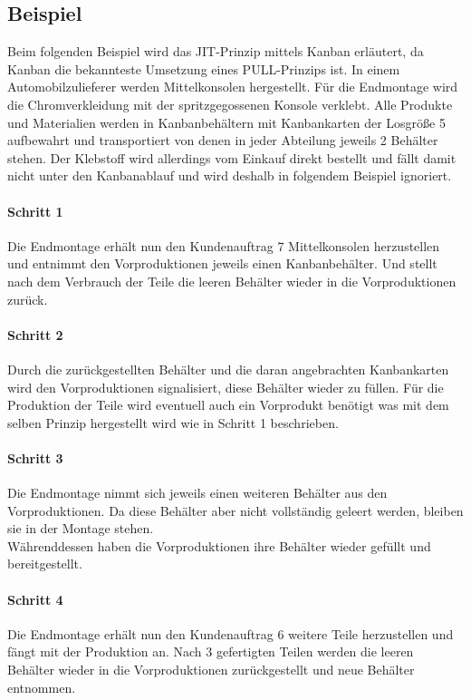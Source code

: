 \documentclass[00_ToyotaProduktionssystem.tex]{subfiles}
\begin{document}
\subsection{Beispiel}
Beim folgenden Beispiel wird das JIT-Prinzip mittels Kanban erläutert, da Kanban die bekannteste Umsetzung eines PULL-Prinzips ist.
In einem Automobilzulieferer werden Mittelkonsolen hergestellt. Für die Endmontage wird die Chromverkleidung mit der spritzgegossenen Konsole verklebt. Alle Produkte und Materialien werden in Kanbanbehältern mit Kanbankarten der Losgröße 5 aufbewahrt und transportiert von denen in jeder Abteilung jeweils 2 Behälter stehen. Der Klebstoff wird allerdings vom Einkauf direkt bestellt und fällt damit nicht unter den Kanbanablauf und wird deshalb in folgendem Beispiel ignoriert.

\paragraph{Schritt 1}
Die Endmontage erhält nun den Kundenauftrag 7 Mittelkonsolen herzustellen und entnimmt den Vorproduktionen jeweils einen Kanbanbehälter. Und stellt nach dem Verbrauch der Teile die leeren Behälter wieder in die Vorproduktionen zurück.

\paragraph{Schritt 2}
Durch die zurückgestellten Behälter und die daran angebrachten Kanbankarten wird den Vorproduktionen signalisiert, diese Behälter wieder zu füllen. Für die Produktion der Teile wird eventuell auch ein Vorprodukt benötigt was mit dem selben Prinzip hergestellt wird wie in Schritt 1 beschrieben.

\paragraph{Schritt 3}
Die Endmontage nimmt sich jeweils einen weiteren Behälter aus den Vorproduktionen. Da diese Behälter aber nicht vollständig geleert werden, bleiben sie in der Montage stehen.\\
Währenddessen haben die Vorproduktionen ihre Behälter wieder gefüllt und bereitgestellt.

\paragraph{Schritt 4}
Die Endmontage erhält nun den Kundenauftrag 6 weitere Teile herzustellen und fängt mit der Produktion an. Nach 3 gefertigten Teilen werden die leeren Behälter wieder in die Vorproduktionen zurückgestellt und neue Behälter entnommen.
\end{document}
